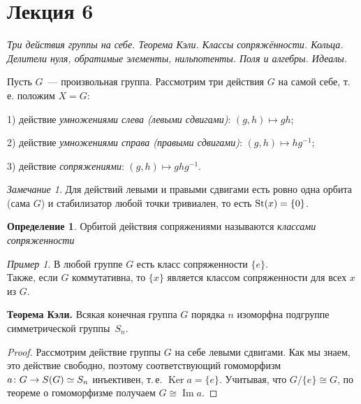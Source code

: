 \documentclass[a4paper,10pt]{amsart}
\newcommand{\Ker}{\mathop{\mathrm{Ker}}}
\renewcommand{\Im}{\mathop{\mathrm{Im}}}
\def\St{{\rm St}}%
\theoremstyle{definition}
\newtheorem{definition}{Определение}
\theoremstyle{remark}
\newtheorem{remark}{Замечание}
\newtheorem{example}{Пример}
\begin{document}
\newpage

\section*{Лекция 6}

\medskip

{\it Три действия группы на себе. Теорема Кэли. Классы сопряжённости.
Кольца. Делители нуля, обратимые элементы, нильпотенты. Поля и алгебры.
Идеалы. }

\medskip

Пусть $G$~--- произвольная группа. Рассмотрим три действия $G$ на
самой себе, т.\,е. положим $X=G$:

1) действие {\it умножениями слева (левыми сдвигами)}: $(g,h)\mapsto gh$;

2) действие {\it умножениями справа (правыми сдвигами)}: $(g,h)\mapsto hg^{-1}$;

3) действие {\it сопряжениями}: $(g,h)\mapsto ghg^{-1}$.

\begin{remark}
Для действий левыми и правыми сдвигами есть ровно одна орбита (сама $G$) и
стабилизатор любой точки тривиален, то есть $\St(x) = \{0\}$.
\end{remark}

\begin{definition}
Орбитой действия сопряжениями называются \textit{классами сопряженности}
\end{definition}

\begin{example}
В любой группе $G$ есть класс сопряженности $\{e\}$. \\Также, если $G$ коммутативна, то $\{x\}$ является классом сопряженности для всех $x$ из $G$.
\end{example}

\smallskip

{\bf Теорема Кэли.} Всякая конечная группа $G$ порядка $n$ изоморфна
подгруппе симметрической группы~$S_n$.

\begin{proof}
Рассмотрим действие группы $G$ на себе левыми сдвигами. Как мы
знаем, это действие свободно, поэтому соответствующий гомоморфизм $a
\colon G \to S(G) \simeq\nobreak S_n$ инъективен, т.\,е. $\Ker a =
\lbrace e \rbrace$. Учитывая, что $G / \lbrace e \rbrace \cong G$,
по теореме о гомоморфизме получаем $G \cong \Im a$.
\end{proof}
\end{document}
